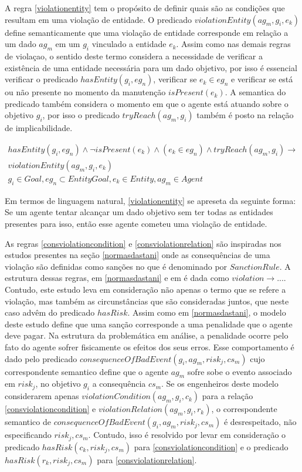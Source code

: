 A regra \ref{violationentity} tem o propósito de definir quais são as condições que resultam em uma violação de entidade. O predicado $violationEntity(ag_m,g_i,e_k)$ 
define semanticamente que uma violação de entidade corresponde em relação a um dado $ag_m$ em um $g_i$ vinculado a entidade $e_k$. Assim como nas demais
regras de violaçao, o sentido deste termo considera a necessidade de verificar a existência de uma entidade necessária para um dado objetivo, 
por isso é essencial verificar o predicado $hasEntity(g_i,eg_n)$, verificar se $e_k \in eg_n$ e verificar se está ou não presente no momento da manutenção 
$isPresent(e_k)$. A semantica do predicado também considera o momento em que o agente está atuando sobre o objetivo $g_i$, por isso o predicado $tryReach(ag_m,g_i)$
também é posto na relação de implicabilidade.

\begin{eqnarray}\label{violationentity}\nonumber
	hasEntity(g_i,eg_n) \wedge \neg isPresent(e_k) 	\wedge (e_k \in eg_n) \wedge tryReach(ag_m,g_i) \to \nonumber \\ 
    violationEntity(ag_m,g_i,e_k)  \nonumber \\  
    g_i \in Goal, eg_n \subset EntityGoal, e_k \in Entity, ag_m \in Agent
\end{eqnarray}

Em termos de linguagem natural, \ref{violationentity} se apreseta da seguinte forma: Se um agente tentar alcançar um dado objetivo sem ter todas as entidades
presentes para isso, então esse agente cometeu uma violação de entidade.

As regras \ref{consviolationcondition} e \ref{consviolationrelation} são inspiradas nos estudos presentes na seção \ref{normasdastani} onde as consequências 
de uma violação são definidas como sanções no que é denominado por $Sanction Rule$. A estrutura dessas regras, em \ref{normasdastani} e em \cite{dastaniframework} 
é dada como $violation \to ... $. Contudo, este estudo leva em consideração não apenas o termo que se refere a violação, mas também as circunstâncias 
que são consideradas juntos, que neste caso advêm do predicado $hasRisk$. Assim como em \ref{normasdastani}, o modelo deste estudo define que uma sanção 
corresponde a uma penalidade que o agente deve pagar. Na estrutura da problemática em análise, a penalidade ocorre pelo fato do agente sofrer fisicamente 
os efeitos dos seus erros. Esse comportamento é dado pelo predicado $consequenceOfBadEvent(g_i,ag_m,risk_j,cs_m)$ cujo correspondente semantico define 
que o agente $ag_m$ sofre sobe o evento associado em $risk_j$, no objetivo $g_i$ a consequência $cs_m$. Se os engenheiros deste modelo considerarem 
apenas $violationCondition(ag_m,g_i,c_k)$ para a relação \ref{consviolationcondition} e $violationRelation(ag_m,g_i,r_k)$, o correspondente semantico de 
$consequenceOfBadEvent(g_i,ag_m,risk_j,cs_m)$ é desrespeitado, não especificando $risk_j,cs_m$. Contudo, isso é resolvido por levar em consideração 
o predicado $hasRisk(c_k,risk_j,cs_m)$ para \ref{consviolationcondition} e o predicado $hasRisk(r_k,risk_j,cs_m)$ para \ref{consviolationrelation}. 

